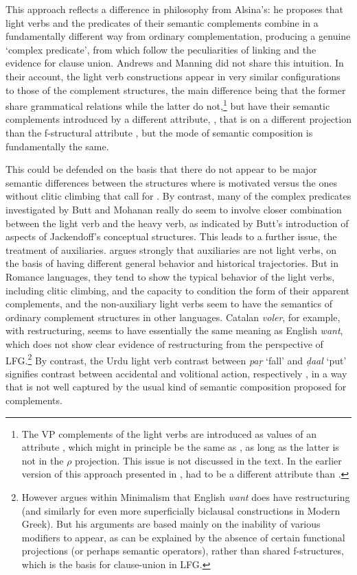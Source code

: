 \documentclass[output=paper,hidelinks]{langscibook}
\begin{document}
This approach reflects a difference in philosophy from Alsina's: he proposes that light verbs and
the predicates of their semantic complements combine in a fundamentally different way
from ordinary complementation, producing a genuine `complex predicate',
from which follow the peculiarities of linking and the evidence for clause union.
Andrews and Manning did not share this intuition.  In their account,
the light verb constructions appear in very similar configurations to those of the complement
structures, the main difference being that the former share grammatical relations while the
latter do not,\footnote
 {The VP complements of the light verbs are introduced as values of an attribute {\ARG},
 which might in principle be the same as {\XCOMP}, as long as the latter is not in the
 $\rho$ projection.  This issue is not discussed in the text.  In the earlier version of
 this approach presented in \citet{AndrewsManning1993}, {\ARG} had to be a different
 attribute than {\XCOMP}.}
but have their semantic complements introduced by a different
attribute, {\ARG}, that is on a different projection than the f-structural
attribute {\XCOMP}, but the mode of semantic composition is fundamentally the same.

This could be defended on the basis that there do not appear to be major semantic
differences between the structures where {\ARG} is motivated versus the ones without
clitic climbing that call for {\XCOMP}.  By contrast, many of the complex predicates
investigated by Butt and Mohanan really do seem to involve closer combination between
the light verb and the heavy verb, as indicated by Butt's introduction of aspects
of Jackendoff's conceptual structures.  This leads to a further issue, the treatment
of auxiliaries.  \citet{Butt2010} argues strongly that  auxiliaries are not light
verbs, on the basis of having different general behavior and historical trajectories.
But in Romance languages, they tend to show the typical behavior of the light verbs,
including clitic climbing, and the capacity to condition the form of their apparent
complements, and the non-auxiliary light verbs seem to have the semantics of ordinary
complement structures in other languages.  Catalan \emph{voler}, for example, with restructuring,
seems to have essentially the same meaning as English \emph{want}, which does not show clear
evidence of restructuring from the perspective of LFG.\footnote
 {However \citet{Grano2015} argues within Minimalism that English \emph{want} does have
 restructuring (and similarly for even more superficially biclausal constructions
 in Modern Greek).  But his arguments are based mainly on the inability of various
 modifiers to appear, as can be explained by the absence of certain functional
 projections (or perhaps semantic operators), rather than shared f-structures, which is the basis for clause-union
 in LFG.}
By contrast, the Urdu light verb contrast between \emph{pa\d r} `fall' and \emph{\d daal}
`put' signifies contrast between accidental and volitional action, respectively
\citep[108--109]{Butt1995}, in a way that is not well captured by the usual kind of
semantic composition proposed for complements.
\end{document}
